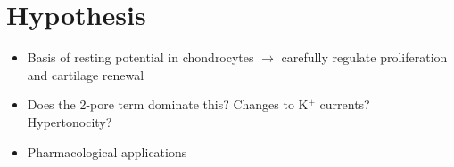 \section{Hypothesis}
\label{hypothesis}

\begin{itemize}
\item Basis of resting potential in chondrocytes $\rightarrow$ carefully
  regulate proliferation and cartilage renewal
\item Does the 2-pore term dominate this? Changes to K$^{+}$ currents?
  Hypertonocity?
\item Pharmacological applications
\end{itemize}

